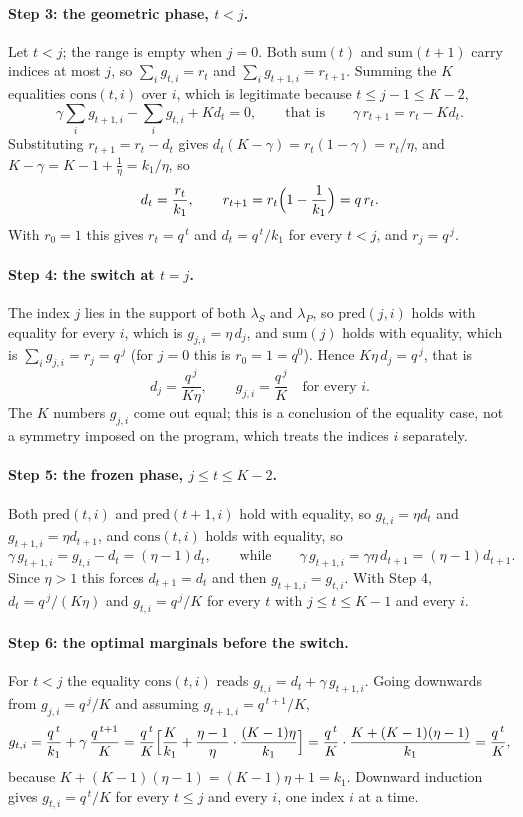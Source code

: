 \paragraph{Step 3: the geometric phase, $t<j$.}
Let $t<j$; the range is empty when $j=0$.  Both $\mathrm{sum}(t)$ and
$\mathrm{sum}(t+1)$ carry indices at most $j$, so
$\sum_ig_{t,i}=r_t$ and $\sum_ig_{t+1,i}=r_{t+1}$.  Summing the $K$ equalities
$\mathrm{cons}(t,i)$ over $i$, which is legitimate because
$t\le j-1\le K-2$,
\[
  \gamma\sum_ig_{t+1,i}-\sum_ig_{t,i}+Kd_t=0,
  \qquad\text{that is}\qquad
  \gamma\,r_{t+1}=r_t-Kd_t .
\]
Substituting $r_{t+1}=r_t-d_t$ gives $d_t(K-\gamma)=r_t(1-\gamma)=r_t/\eta$,
and $K-\gamma=K-1+\tfrac1\eta=k_1/\eta$, so
\[
  d_t=\frac{r_t}{k_1},\qquad r_{t+1}=r_t\Bigl(1-\frac1{k_1}\Bigr)=q\,r_t .
\]
With $r_0=1$ this gives $r_t=q^{\,t}$ and $d_t=q^{\,t}/k_1$ for every $t<j$,
and $r_j=q^{\,j}$.

\paragraph{Step 4: the switch at $t=j$.}
The index $j$ lies in the support of both $\lambda_S$ and $\lambda_P$, so
$\mathrm{pred}(j,i)$ holds with equality for every $i$, which is
$g_{j,i}=\eta\,d_j$, and $\mathrm{sum}(j)$ holds with equality, which is
$\sum_ig_{j,i}=r_j=q^{\,j}$ (for $j=0$ this is $r_0=1=q^{0}$).  Hence
$K\eta\,d_j=q^{\,j}$, that is
\[
  d_j=\frac{q^{\,j}}{K\eta},\qquad
  g_{j,i}=\frac{q^{\,j}}{K}\quad\text{for every }i .
\]
The $K$ numbers $g_{j,i}$ come out equal; this is a conclusion of the equality
case, not a symmetry imposed on the program, which treats the indices $i$
separately.

\paragraph{Step 5: the frozen phase, $j\le t\le K-2$.}
Both $\mathrm{pred}(t,i)$ and $\mathrm{pred}(t+1,i)$ hold with equality, so
$g_{t,i}=\eta d_t$ and $g_{t+1,i}=\eta d_{t+1}$, and $\mathrm{cons}(t,i)$
holds with equality, so
\[
  \gamma\,g_{t+1,i}=g_{t,i}-d_t=(\eta-1)d_t,
  \qquad\text{while}\qquad
  \gamma\,g_{t+1,i}=\gamma\eta\,d_{t+1}=(\eta-1)d_{t+1} .
\]
Since $\eta>1$ this forces $d_{t+1}=d_t$ and then $g_{t+1,i}=g_{t,i}$.  With
Step 4, $d_t=q^{\,j}/(K\eta)$ and $g_{t,i}=q^{\,j}/K$ for every $t$ with
$j\le t\le K-1$ and every $i$.

\paragraph{Step 6: the optimal marginals before the switch.}
For $t<j$ the equality $\mathrm{cons}(t,i)$ reads
$g_{t,i}=d_t+\gamma\,g_{t+1,i}$.  Going downwards from
$g_{j,i}=q^{\,j}/K$ and assuming $g_{t+1,i}=q^{\,t+1}/K$,
\[
  g_{t,i}=\frac{q^{\,t}}{k_1}+\gamma\,\frac{q^{\,t+1}}{K}
  =\frac{q^{\,t}}{K}\Bigl[\frac{K}{k_1}
    +\frac{\eta-1}{\eta}\cdot\frac{(K-1)\eta}{k_1}\Bigr]
  =\frac{q^{\,t}}{K}\cdot\frac{K+(K-1)(\eta-1)}{k_1}
  =\frac{q^{\,t}}{K},
\]
because $K+(K-1)(\eta-1)=(K-1)\eta+1=k_1$.  Downward induction gives
$g_{t,i}=q^{\,t}/K$ for every $t\le j$ and every $i$, one index $i$ at a time.


